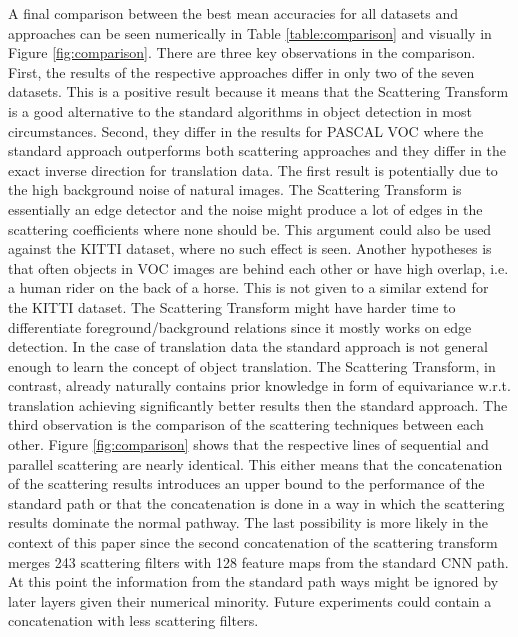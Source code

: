 A final comparison between the best mean accuracies for all datasets and approaches can be seen numerically in Table \ref{table:comparison} and visually in Figure \ref{fig:comparison}. There are three key observations in the comparison. First, the results of the respective approaches differ in only two of the seven datasets. This is a positive result because it means that the Scattering Transform is a good alternative to the standard algorithms in object detection in most circumstances. Second, they differ in the results for PASCAL VOC where the standard approach outperforms both scattering approaches and they differ in the exact inverse direction for translation data. The first result is potentially due to the high background noise of natural images. The Scattering Transform is essentially an edge detector and the noise might produce a lot of edges in the scattering coefficients where none should be. This argument could also be used against the KITTI dataset, where no such effect is seen. Another hypotheses is that often objects in VOC images are behind each other or have high overlap, i.e. a human rider on the back of a horse. This is not given to a similar extend for the KITTI dataset. The Scattering Transform might have harder time to differentiate foreground/background relations since it mostly works on edge detection. In the case of translation data the standard approach is not general enough to learn the concept of object translation. The Scattering Transform, in contrast, already naturally contains prior knowledge in form of equivariance w.r.t. translation achieving significantly better results then the standard approach. The third observation is the comparison of the scattering techniques between each other. Figure \ref{fig:comparison} shows that the respective lines of sequential and parallel scattering are nearly identical. This either means that the concatenation of the scattering results introduces an upper bound to the performance of the standard path or that the concatenation is done in a way in which the scattering results dominate the normal pathway. The last possibility is more likely in the context of this paper since the second concatenation of the scattering transform merges 243 scattering filters with 128 feature maps from the standard CNN path. At this point the information from the standard path ways might be ignored by later layers given their numerical minority. Future experiments could contain a concatenation with less scattering filters. 

